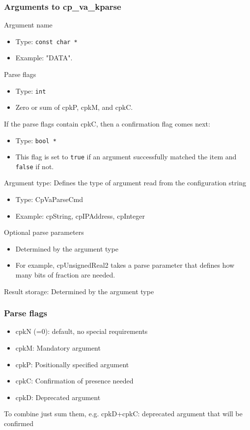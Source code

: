 \documentclass{beamer}
\begin{document}
\begin{frame}
\frametitle{Arguments to cp\_va\_kparse}
Argument name
\begin{itemize}
	\item Type: \lstinline!const char *!
	\item Example: "DATA".
\end{itemize}
Parse flags
\begin{itemize}
	\item Type: \lstinline!int!
	\item Zero or sum of cpkP, cpkM, and cpkC.
\end{itemize}
If the parse flags contain cpkC, then a confirmation flag comes next:
\begin{itemize}
	\item Type: \lstinline!bool *!
	\item This flag is set to \lstinline!true! if an argument successfully matched the item and \lstinline!false! if not.
\end{itemize}
Argument type: Defines the type of argument read from the configuration string
\begin{itemize}
	\item Type: CpVaParseCmd
	\item Example: cpString, cpIPAddress, cpInteger
\end{itemize}
Optional parse parameters
\begin{itemize}
	\item Determined by the argument type
	\item For example, cpUnsignedReal2 takes a parse parameter that defines how many bits of fraction are needed.
\end{itemize}
Result storage: Determined by the argument type
\end{frame}

\begin{frame}[fragile]
\frametitle{Parse flags}
\begin{itemize}
	\item cpkN (=0): default, no special requirements
	\item cpkM: Mandatory argument
	\item cpkP: Positionally specified argument
	\item cpkC: Confirmation of presence needed
	\item cpkD: Deprecated argument
\end{itemize}
To combine just sum them, e.g. cpkD+cpkC: deprecated argument that will be confirmed
\end{frame}
\end{document}
